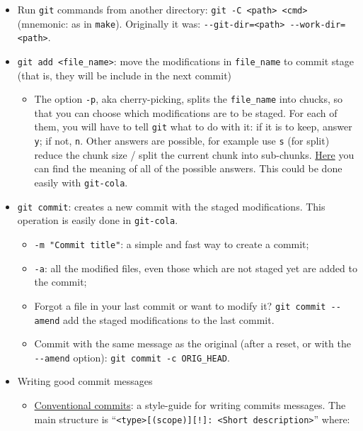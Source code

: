 \documentclass[a4paper,12pt,%
              final%
              ]{article}
\begin{document}
\begin{itemize}
  \item Run \verb|git| commands from another directory: \verb|git -C <path> <cmd>| (mnemonic: as in \verb|make|). Originally it was: \verb|--git-dir=<path> --work-dir=<path>|.
  \item \verb|git add <file_name>|: move the modifications in \verb|file_name| to commit stage (that is, they will be include in the next commit)
    \begin{itemize}
      \item The option \texttt{-p}, aka cherry-picking, splits the \verb|file_name| into chucks, so that you can choose which modifications are to be staged. For each of them, you will have to tell \texttt{git} what to do with it: if it is to keep, answer \texttt{y}; if not, \texttt{n}. Other answers are possible, for example use \texttt{s} (for split) reduce the chunk size / split the current chunk into sub-chunks. \href{https://stackoverflow.com/questions/1122210/can-i-modify-git-adds-hunk-size}{Here} you can find the meaning of all of the possible answers. This could be done easily with \texttt{git-cola}.
    \end{itemize}
  \item \texttt{git commit}: creates a new commit with the staged modifications. This operation is easily done in \texttt{git-cola}.
    \begin{itemize}
      \item \verb|-m "Commit title"|: a simple and fast way to create a commit;
      \item \texttt{-a}: all the modified files, even those which are not staged yet are added to the commit;
      \item Forgot a file in your last commit or want to modify it? \verb|git commit --amend| add the staged modifications to the last commit.
      \item Commit with the same message as the original (after a reset, or with the \verb|--amend| option): \verb|git commit -c ORIG_HEAD|.
    \end{itemize}
  \item Writing good commit messages
    \begin{itemize}
      \item \href{https://www.conventionalcommits.org/en/v1.0.0/}{Conventional commits}: a style-guide for writing commits messages. The main structure is ``\texttt{<type>[(scope)][!]: <Short description>}'' where:
        \begin{itemize}

\end{itemize}
\end{itemize}
\end{itemize}
\end{document}
